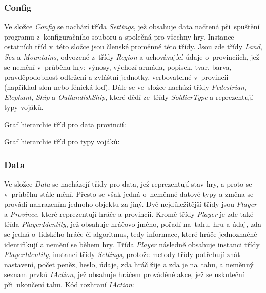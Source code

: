 \documentclass[a4paper,12pt]{article}
\begin{document}
\subsubsection{Config}
Ve složce \textit{Config} se nachází třída \textit{Settings}, jež obsahuje data načtená při~spuštění programu z~konfiguračního souboru a společná pro všechny hry. Instance ostatních tříd v~této složce jsou členské proměnné této třídy. Jsou zde třídy \textit{Land}, \textit{Sea} a \textit{Mountains}, odvozené z~třídy \textit{Region} a uchovávající údaje o~provinciích, jež se nemění v~průběhu hry: výnosy, výchozí armáda, popisek, tvar, barva, pravděpodobnost odtržení a zvláštní jednotky, verbovatelné v~provincii (například slon nebo fénická loď). Dále se ve~složce nachází třídy \textit{Pedestrian}, \textit{Elephant}, \textit{Ship} a \textit{OutlandishShip}, které dědí ze~třídy \textit{SoldierType} a reprezentují typy vojáků.

Graf hierarchie tříd pro data provincií:


Graf hierarchie tříd pro typy vojáků:


\subsubsection{Data}
Ve složce \textit{Data} se nacházejí třídy pro data, jež reprezentují stav hry, a proto se v~průběhu stále mění. Přesto se však jedná o~neměnné datové typy a změna se provádí nahrazením jednoho objektu za jiný. Dvě nejdůležitější třídy jsou \textit{Player} a \textit{Province}, které reprezentují hráče a provincii. Kromě třídy \textit{Player} je zde také třída \textit{PlayerIdentity}, jež obsahuje hráčovo jméno, pořadí na~tahu, hru a údaj, zda se jedná o~lidského hráče či algoritmus, tedy informace, které hráče jednoznačně identifikují a nemění se během hry. Třída \textit{Player} následně obsahuje instanci třídy \textit{PlayerIdentity}, instanci třídy \textit{Settings}, protože metody třídy potřebují znát nastavení, počet peněz, heslo, údaje, zda hráč žije a zda je na~tahu, a neměnný seznam prvků \textit{IAction}, jež obsahuje hráčem prováděné akce, jež se uskuteční při~ukončení tahu. Kód rozhraní \textit{IAction}:
\end{document}
